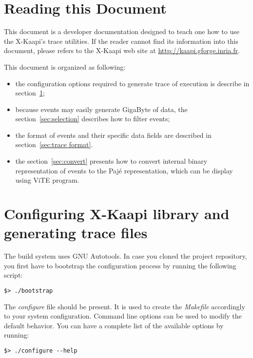 \documentclass{article}[12pt]
\newcommand{\kaapi}{\textsc{X}-Kaapi\xspace}
\begin{document}
\newpage
\section*{Reading this Document}
This document is a developer documentation designed to teach one how to use the \kaapi's trace utilities. If the reader cannot find its information into this document, please refers to the \kaapi web site at \url{http://kaapi.gforge.inria.fr}.

This document is organized as following:
\begin{itemize}
\item the configuration options required to generate trace of execution is describe in section~\ref{sec:option};
\item because events may easily generate GigaByte of data, the section~\ref{sec:selection} describes how to filter events;
\item the format of events and their specific data fields are described in section~\ref{sec:trace format}.
\item the section~\ref{sec:convert} presents how to convert internal binary representation of events to the Paj\'e representation, which can be display using ViTE program.
\end{itemize}

\newpage
\section{Configuring \kaapi library and generating trace files} \label{sec:option}

The build system uses GNU Autotools.
In case you cloned the project repository, you first have to bootstrap the configuration process by running the following script:
\begin{verbatim}
$> ./bootstrap
\end{verbatim}
The \textit{configure} file should be present. 
It is used to create the \textit{Makefile} accordingly to your system configuration. Command line
options can be used to modify the default behavior. You can have a complete
list of the available options by running:
\begin{verbatim}
$> ./configure --help
\end{verbatim}
\end{document}
